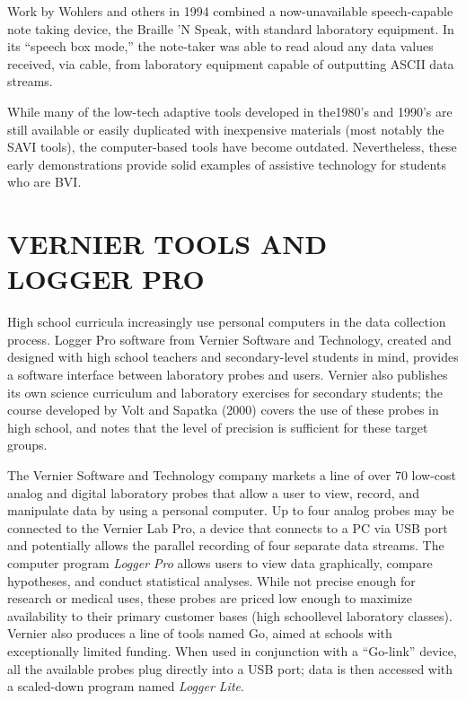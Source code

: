 \documentclass[11.5pt]{sig-alternate} %
\begin{document}
\begin{large}
Work by Wohlers and others in 1994 combined a now-unavailable speech-capable note taking device, the Braille 'N Speak, with standard laboratory equipment. In its “speech box mode,” the note-taker was able to read aloud any data values received, via cable, from laboratory equipment capable of outputting ASCII data streams.  
 
While many of the low-tech adaptive tools developed in the1980’s and 1990’s are still available or easily duplicated with inexpensive materials (most notably the SAVI tools), the computer-based tools have become outdated.  Nevertheless, these early demonstrations provide solid examples of assistive technology for students who are BVI. 
 
\section*{VERNIER TOOLS AND LOGGER PRO}
 
High school curricula increasingly use personal computers in the data collection process. Logger Pro software from Vernier Software and Technology, created and designed with high school teachers and secondary-level students in mind, provides a software interface between laboratory probes and users. Vernier also publishes its own science curriculum and laboratory exercises for secondary students; the course developed by Volt and Sapatka (2000) covers the use of these probes in high school, and notes that the level of precision is sufficient for these target groups. 
 
The Vernier Software and Technology company markets a line of over 70 low-cost analog and digital laboratory probes that allow a user to view, record, and manipulate data by using a personal computer. Up to four analog probes may be connected to the Vernier Lab Pro, a device that connects to a PC via USB port and potentially allows the parallel recording of four separate data streams. The computer program\textit{ Logger Pro} allows users to view data graphically, compare hypotheses, and conduct statistical analyses. While not precise enough for research or medical uses, these probes are priced low enough to maximize availability to their primary customer bases (high schoollevel laboratory classes). Vernier also produces a line of tools named Go, aimed at schools with exceptionally limited funding. When used in conjunction with a “Go-link” device, all the available probes plug directly into a USB port; data is then accessed with a scaled-down program named \textit{Logger Lite}.
 

\end{large}
\end{document}
